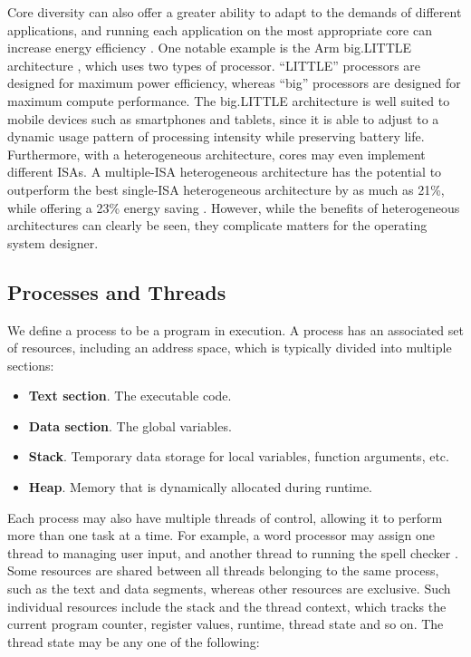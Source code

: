 \documentclass[bsc,frontabs,twoside,singlespacing,parskip,deptreport]{infthesis}     %
\begin{document}
Core diversity can also offer a greater ability to adapt to the demands of different applications, and running each application on the most appropriate core can increase energy efficiency \cite{kumar_2003}. One notable example is the Arm big.LITTLE architecture \cite{big.little}, which uses two types of processor. “LITTLE” processors are designed for maximum power efficiency, whereas “big” processors are designed for maximum compute performance. The big.LITTLE architecture is well suited to mobile devices such as smartphones and tablets, since it is able to adjust to a dynamic usage pattern of processing intensity while preserving battery life. Furthermore, with a heterogeneous architecture, cores may even implement different ISAs. A multiple-ISA heterogeneous architecture has the potential to outperform the best single-ISA heterogeneous architecture by as much as 21\%, while offering a 23\% energy saving \cite{venkat_2014}. However, while the benefits of heterogeneous architectures can clearly be seen, they complicate matters for the operating system designer.

\subsection{Processes and Threads} 
\label{processes-threads}
We define a process to be a program in execution. A process has an associated set of resources, including an address space, which is typically divided into multiple sections:

\begin{itemize}
    \item{\textbf{Text section}. The executable code.}
    \item{\textbf{Data section}. The global variables.}
    \item{\textbf{Stack}. Temporary data storage for local variables, function arguments, etc.}
    \item{\textbf{Heap}. Memory that is dynamically allocated during runtime.}
\end{itemize}

Each process may also have multiple threads of control, allowing it to perform more than one task at a time. For example, a word processor may assign one thread to managing user input, and another thread to running the spell checker \cite{silberschatz}. Some resources are shared between all threads belonging to the same process, such as the text and data segments, whereas other resources are exclusive. Such individual resources include the stack and the thread context, which tracks the current program counter, register values, runtime, thread state and so on. The thread state may be any one of the following:
\end{document}
